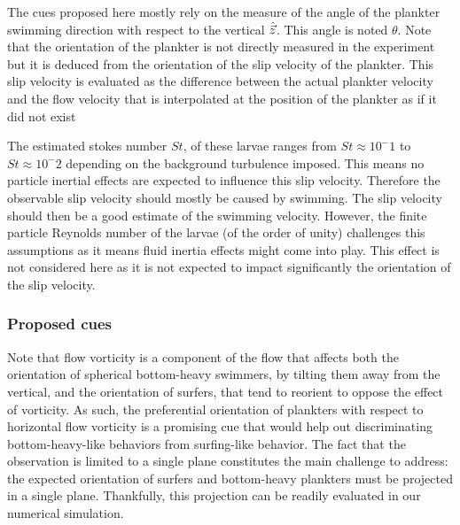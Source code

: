 The cues proposed here mostly rely on the measure of the angle of the plankter swimming direction with respect to the vertical $\hat{\vec{z}}$.
This angle is noted $\theta$.
Note that the orientation of the plankter is not directly measured in the experiment but it is deduced from the orientation of the slip velocity of the plankter.
This slip velocity is evaluated as the difference between the actual plankter velocity and the flow velocity that is interpolated at the position of the plankter as if it did not exist

The estimated stokes number $\mathit{St}$, of these larvae ranges from $\mathit{St} \approx 10^-1$ to $\mathit{St} \approx 10^-2$ depending on the background turbulence imposed.
This means no particle inertial effects are expected to influence this slip velocity.
Therefore the observable slip velocity should mostly be caused by swimming.
The slip velocity should then be a good estimate of the swimming velocity.
However, the finite particle Reynolds number of the larvae (of the order of unity) challenges this assumptions as it means fluid inertia effects might come into play.
This effect is not considered here as it is not expected to impact significantly the orientation of the slip velocity.

\subsubsection{Proposed cues}

Note that flow vorticity is a component of the flow that affects both the orientation of spherical bottom-heavy swimmers, by tilting them away from the vertical, and the orientation of surfers, that tend to reorient to oppose the effect of vorticity.
As such, the preferential orientation of plankters with respect to horizontal flow vorticity is a promising cue that would help out discriminating bottom-heavy-like behaviors from surfing-like behavior.
The fact that the observation is limited to a single plane constitutes the main challenge to address: the expected orientation of surfers and bottom-heavy plankters must be projected in a single plane.
Thankfully, this projection can be readily evaluated in our numerical simulation.

